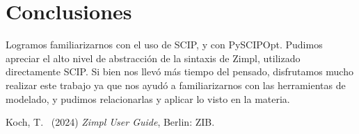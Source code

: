 \documentclass[11pt, a4paper, pdftex]{article}
\begin{document}
\newpage
\section{Conclusiones}

Logramos familiarizarnos con el uso de SCIP, y con PySCIPOpt.
Pudimos apreciar el alto nivel de abstracción de la sintaxis de Zimpl, utilizado directamente SCIP. Si bien nos llevó más tiempo del pensado, disfrutamos mucho realizar este trabajo ya que nos ayudó a familiarizarnos con las herramientas de modelado, y pudimos relacionarlas y aplicar lo visto en la materia.


\begin{thebibliography}{99}
	Koch, T.\
	(2024)
	\emph{Zimpl User Guide},
	Berlin: ZIB.
\end{thebibliography}
\end{document}
